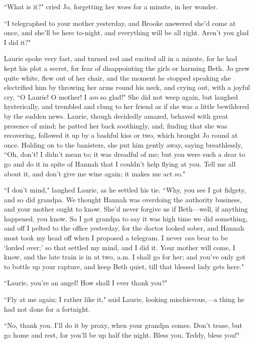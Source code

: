 ``What is it?" cried Jo, forgetting her woes for a minute, in her wonder.

``I telegraphed to your mother yesterday, and Brooke answered
she'd come at once, and she'll be here
to-night, and everything will be all right. Aren't you
glad I did it?"

Laurie spoke very fast, and turned red and excited all in a minute, for
he had kept his plot a secret, for fear of disappointing the girls or
harming Beth. Jo grew quite white, flew out of her chair, and the moment
he stopped speaking she electrified him by throwing her arms round his
neck, and crying out, with a joyful cry, ``O Laurie! O mother! I
\emph{am} so glad!" She did not weep again, but laughed hysterically,
and trembled and clung to her friend as if she was a little bewildered
by the sudden news. Laurie, though decidedly amazed, behaved with great
presence of mind; he patted her back soothingly, and, finding that she
was recovering, followed it up by a bashful kiss or two, which brought
Jo round at once. Holding on to the banisters, she put him gently away,
saying breathlessly, ``Oh, don't! I
didn't mean to; it was dreadful of me; but you were such
a dear to go and do it in spite of Hannah that I
couldn't help flying at you. Tell me all about it, and
don't give me wine again; it makes me act so."

``I don't mind," laughed Laurie, as he settled his tie.
``Why, you see I got fidgety, and so did grandpa. We thought Hannah was
overdoing the authority business, and your mother ought to know.
She'd never forgive us if Beth---well, if anything
happened, you know. So I got grandpa to say it was high time we did
something, and off I pelted to the office yesterday, for the doctor
looked sober, and Hannah most took my head off when I proposed a
telegram. I never \emph{can} bear to be `lorded
over;' so that settled my mind, and I did it. Your
mother will come, I know, and the late train is in at two, {a.m.} I
shall go for her; and you've only got to bottle up your
rapture, and keep Beth quiet, till that blessed lady gets here."

``Laurie, you're an angel! How shall I ever thank you?"

``Fly at me again; I rather like it," said Laurie, looking
mischievous,---a thing he had not done for a fortnight.

``No, thank you. I'll do it by proxy, when your grandpa
comes. Don't tease, but go home and rest, for
you'll be up half the night. Bless you, Teddy, bless
you!"

